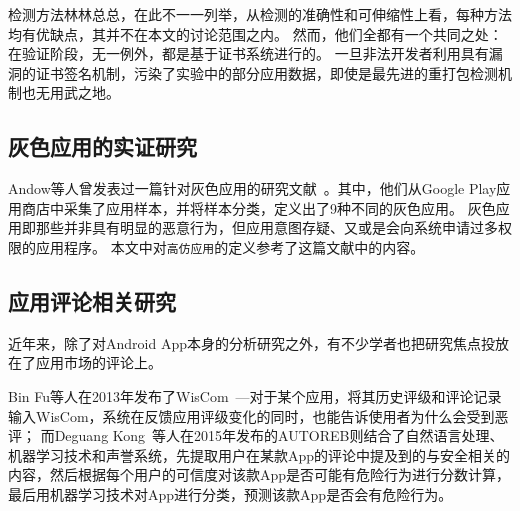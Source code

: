 检测方法林林总总，在此不一一列举，从检测的准确性和可伸缩性上看，每种方法均有优缺点，其并不在本文的讨论范围之内。
然而，他们全都有一个共同之处：在验证阶段，无一例外，都是基于证书系统进行的。
一旦非法开发者利用具有漏洞的证书签名机制，污染了实验中的部分应用数据，即使是最先进的重打包检测机制也无用武之地。

\subsection{灰色应用的实证研究}

Andow等人曾发表过一篇针对灰色应用的研究文献~\cite{Andow2016ASO}。其中，他们从Google Play应用商店中采集了应用样本，并将样本分类，定义出了9种不同的灰色应用。
灰色应用即那些并非具有明显的恶意行为，但应用意图存疑、又或是会向系统申请过多权限的应用程序。
本文中对\texttt{高仿应用}的定义参考了这篇文献中的内容。

\subsection{应用评论相关研究}
近年来，除了对Android App本身的分析研究之外，有不少学者也把研究焦点投放在了应用市场的评论上。

Bin Fu等人在2013年发布了WisCom~\cite{fu2013people}---对于某个应用，将其历史评级和评论记录输入WisCom，系统在反馈应用评级变化的同时，也能告诉使用者为什么会受到恶评；
而Deguang Kong~\cite{kong2015autoreb}等人在2015年发布的AUTOREB则结合了自然语言处理、机器学习技术和声誉系统，先提取用户在某款App的评论中提及到的与安全相关的内容，然后根据每个用户的可信度对该款App是否可能有危险行为进行分数计算，最后用机器学习技术对App进行分类，预测该款App是否会有危险行为。

